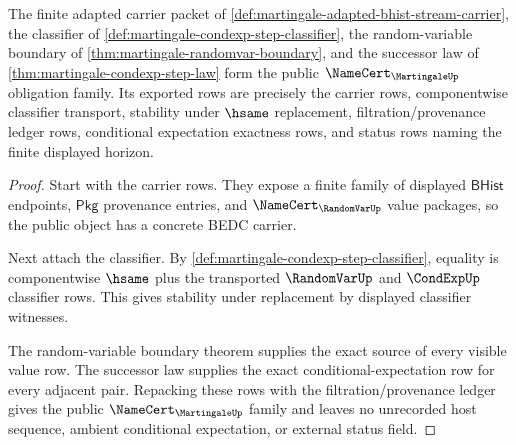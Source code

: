 \begin{theorem}
\label{thm:martingale-public-certificate-row-family}
The finite adapted carrier packet of
\autoref{def:martingale-adapted-bhist-stream-carrier}, the classifier of
\autoref{def:martingale-condexp-step-classifier}, the random-variable boundary
of \autoref{thm:martingale-randomvar-boundary}, and the successor law of
\autoref{thm:martingale-condexp-step-law} form the public
$\NameCert_{\MartingaleUp}$ obligation family. Its exported rows are precisely
the carrier rows, componentwise classifier transport, stability under
$\hsame$ replacement, filtration/provenance ledger rows, conditional
expectation exactness rows, and status rows naming the finite displayed
horizon.
\end{theorem}
\begin{proof}
Start with the carrier rows. They expose a finite family of displayed
$\mathsf{BHist}$ endpoints, $\mathsf{Pkg}$ provenance entries, and
$\NameCert_{\RandomVarUp}$ value packages, so the public object has a
concrete BEDC carrier.

Next attach the classifier. By
\autoref{def:martingale-condexp-step-classifier}, equality is componentwise
$\hsame$ plus the transported $\RandomVarUp$ and $\CondExpUp$ classifier
rows. This gives stability under replacement by displayed classifier
witnesses.

The random-variable boundary theorem supplies the exact source of every
visible value row. The successor law supplies the exact
conditional-expectation row for every adjacent pair. Repacking these rows
with the filtration/provenance ledger gives the public
$\NameCert_{\MartingaleUp}$ family and leaves no unrecorded host sequence,
ambient conditional expectation, or external status field.
\end{proof}

